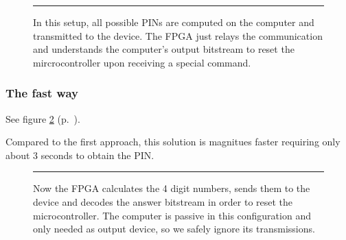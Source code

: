 \begin{figure}[tb]
    \begin{center}
        
        \caption{In this setup, all possible PINs are computed on the computer and transmitted to the device. The FPGA just relays the communication and understands the computer's output bitstream to reset the mircrocontroller upon receiving a special command.}
        \label{fig:as4-schematic-1}
        \vspace{1em}\hrule
    \end{center}
\end{figure}

\subsubsection*{The fast way}
See figure \ref{fig:as4-schematic-2} (p.~\pageref{fig:as4-schematic-2}).

Compared to the first approach, this solution is magnitues faster requiring only about 3 seconds to obtain the PIN.

\begin{figure}[tb]
    \begin{center}
        
        \caption{Now the FPGA calculates the 4 digit numbers, sends them to the device and decodes the answer bitstream in order to reset the microcontroller. The computer is passive in this configuration and only needed as output device, so we safely ignore its transmissions.}
        \label{fig:as4-schematic-2}
        \vspace{1em}\hrule
    \end{center}
\end{figure}


